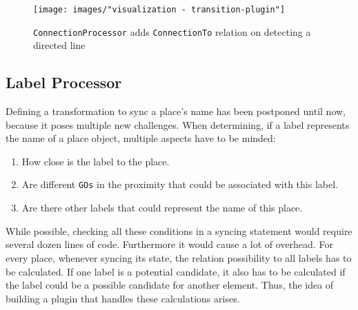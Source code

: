 \begin{figure}[ht]
  \centering
  \texttt{[image: images/"visualization - transition-plugin"]}
  \caption{\texttt{ConnectionProcessor} adds \texttt{ConnectionTo} relation on detecting a directed line}
  \label{fig:transition-plugin}
\end{figure}



\subsection{Label Processor}
Defining a transformation to sync a place's name has been postponed until now, because it poses multiple new challenges. When determining, if a label represents the name of a place object, multiple aspects have to be minded:
\begin{enumerate}
  \item How close is the label to the place.
  \item Are different \texttt{GOs} in the proximity that could be associated with this label.
  \item Are there other labels that could represent the name of this place.
\end{enumerate}

While possible, checking all these conditions in a syncing statement would require several dozen lines of code. Furthermore it would cause a lot of overhead. For every place, whenever syncing its state, the relation possibility to all labels has to be calculated. If one label is a potential candidate, it also has to be calculated if the label could be a possible candidate for another element. Thus, the idea of building a plugin that handles these calculations arises.

